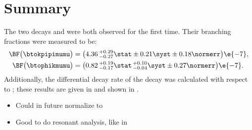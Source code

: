 \section{Summary}
\label{sec:hhh:conc}

The two \fcnc decays \btokpipimumu and \btophikmumu were both observed for the first time.
Their branching fractions were measured to be:
\begin{align*}
  \BF\big( \btokpipimumu \big)&=
  \big(4.36\,^{+0.29}_{-0.27}\stat\pm0.21\syst\pm0.18\normerr\big)\e{-7}, \\
  \BF\big(\btophikmumu\big)&=
  \big(0.82\,^{+0.19}_{-0.17}\stat\,^{+0.10}_{-0.04}\syst\pm0.27\normerr\big)\e{-7}.
\end{align*}
Additionally, the differential decay rate of the decay \btokpipimumu was calculated with respect to
\qsq; these results are given in  and shown in .

\begin{itemize}
  \item Could in future normalize to \decay{\Bp}{\jpsi\Kstar}
  \item Good to do resonant analysis, like in \decay{\Bp}{\kpipi\gamma}
\end{itemize}


